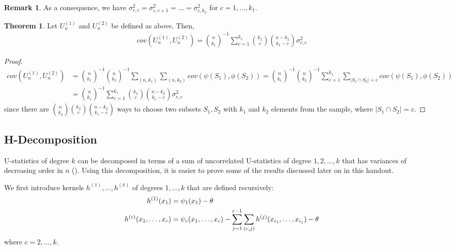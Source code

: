 \documentclass{article}
\theoremstyle{definition}
\newtheorem{theorem}{Theorem}
\numberwithin{Def}{section}
\newtheorem{Rmk}{Remark}
\begin{document}
\begin{Rmk}
 As a consequence, we have $\sigma_{c,c}^2 = \sigma_{c,c+1}^2 = \dotsc = \sigma_{c,k_2}^2$ for $c = 1, \dotsc, k_1$.    
\end{Rmk}
    
    \begin{theorem}
    Let $U_n^{(1)}$ and $U_n^{(2)}$ be defined as above. Then, 
    \begin{align}
        cov(U_n^{(1)}, U_n^{(2)}) = {n \choose k_1}^{-1}\sum_{c=1}^{k_1}{k_2 \choose c}{n-k_2 \choose k_1 - c}\sigma_{c,c}^2
        \end{align}
    \end{theorem}
    \begin{proof}
    \begin{align*}
      cov(U_n^{(1)}, U_n^{(2)}) &= {n \choose k_1}^{-1}{n \choose k_2}^{-1}\sum_{(n,k_1)}\sum_{(n, k_2)} cov(\psi(S_1), \phi(S_2)) = {n \choose k_1}^{-1}{n \choose k_2}^{-1}\sum_{c=1}^{k_1}\sum_{|S_1 \cap S_2| = c} cov(\psi(S_1), \phi(S_2)) \\
      &= {n \choose k_1}^{-1}\sum_{c=1}^{k_1}{k_2 \choose c}{n-k_2 \choose k_1 - c}\sigma_{c,c}^2
    \end{align*}
since there are ${n \choose k_2}{k_2 \choose c}{n-k_2 \choose k_1 - c}$ ways to choose two subsets $S_1, S_2$ with $k_1$ and $k_2$ elements from the sample, where $|S_1 \cap S_2| = c$.
    \end{proof}
    
\subsection{H-Decomposition}
U-statistics of degree $k$ can be decomposed in terms of a sum of uncorrelated U-statistics of degree $1, 2, \dotsc, k$ that has variances of decreasing order in $n$ (\cite{hoeffding1961strong}). Using this decomposition, it is easier to prove some of the  results discussed later on in this handout. 

We first introduce kernels $h^{(1)}, \dotsc, h^{(k)}$ of degrees $1, \dotsc, k$ that are defined recursively: 
\begin{align}
    h^{(1)}(x_1) &= \psi_1(x_1) - \theta \notag \\
    h^{(c)}(x_1, \dotsc, x_c) &= \psi_c(x_1, \dotsc, x_c) - \sum_{j=1}^{c-1}\sum_{(c,j)}h^{(j)}(x_{i_1}, \dotsc, x_{i_j}) - \theta \label{h_recursive}
\end{align}
where $c = 2, \dotsc, k$.
\end{document}
